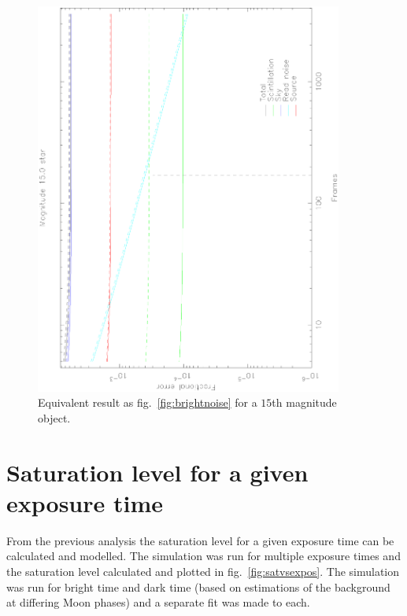 \documentclass[11pt,a4paper]{report}
\begin{document}
\begin{figure}
    \begin{center}
        \includegraphics[angle=270,width=0.9\textwidth]{images/faint}
    \end{center}
    \caption{Equivalent result as fig.~\ref{fig:brightnoise} for a
$15$th magnitude object.}
    \label{fig:faintnoise}
\end{figure}



\section{Saturation level for a given exposure time}
\label{sec:satlevel}

From the previous analysis the saturation level for a given exposure
time can be calculated and modelled. The simulation was run for multiple
exposure times and the saturation level calculated and plotted in
fig.~\ref{fig:satvsexpos}. The simulation was run for bright time and
dark time (based on estimations of the background at differing Moon
phases) and a separate fit was made to each.
\end{document}
